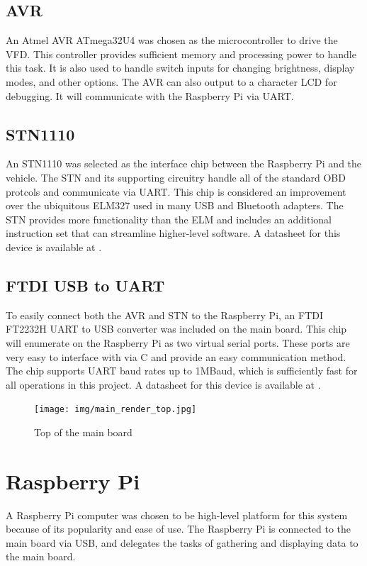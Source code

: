 \subsection{AVR}
An Atmel AVR ATmega32U4 \cite{atmega32u4ds} was chosen as the microcontroller to drive the VFD.  This
controller provides sufficient memory and processing power to handle this task. 
It is also used to handle switch inputs for changing brightness, display modes,
and other options.  The AVR can also output to a character LCD
for debugging.  It will communicate with the Raspberry Pi via UART.

\subsection{STN1110}
An STN1110 was selected as the interface chip between the Raspberry Pi and the 
vehicle.  The STN and its supporting circuitry handle all of the standard OBD
protcols and communicate via UART.  This chip is considered an improvement over
the ubiquitous ELM327 used in many USB and Bluetooth adapters.  The STN provides
more functionality than the ELM and includes an additional instruction set that
can streamline higher-level software. A datasheet for this device is available
at \cite{stn1110ds}.

\subsection{FTDI USB to UART}
To easily connect both the AVR and STN to the Raspberry Pi, an FTDI FT2232H UART 
to USB converter was included on the main board.  This chip will enumerate on the
Raspberry Pi as two virtual serial ports.  These ports are very easy to interface
with via C and provide an easy communication method.  The chip supports UART baud
rates up to 1MBaud, which is sufficiently fast for all operations in this project.
A datasheet for this device is available at \cite{ft2232hds}.

\begin{figure}[h]
\texttt{[image: img/main\_render\_top.jpg]}
\caption{Top of the main board}
\label{fig:main render}
\end{figure}

\section{Raspberry Pi}
\label{sec:raspi-design}

A Raspberry Pi computer was chosen to be high-level platform for this system
because of its popularity and ease of use. The Raspberry Pi is connected to the
main board via USB, and delegates the tasks of gathering and displaying data
to the main board.

